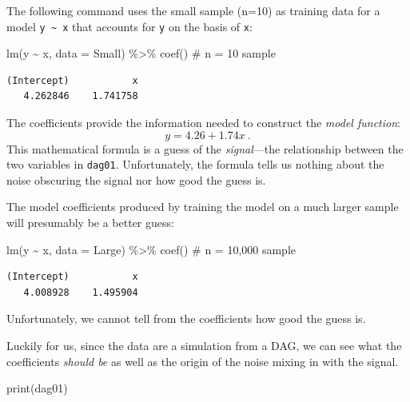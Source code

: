 \documentclass[
  letterpaper,
  DIV=11,
  numbers=noendperiod,
  oneside]{scrreprt}
\newenvironment{Shaded}{\begin{snugshade}}{\end{snugshade}}
\newcommand{\AttributeTok}[1]{\textcolor[rgb]{0.40,0.45,0.13}{#1}}
\newcommand{\CommentTok}[1]{\textcolor[rgb]{0.37,0.37,0.37}{#1}}
\newcommand{\FunctionTok}[1]{\textcolor[rgb]{0.28,0.35,0.67}{#1}}
\newcommand{\NormalTok}[1]{\textcolor[rgb]{0.00,0.23,0.31}{#1}}
\newcommand{\SpecialCharTok}[1]{\textcolor[rgb]{0.37,0.37,0.37}{#1}}
\begin{document}
The following command uses the small sample (n=10) as training data for
a model \texttt{y\ \textasciitilde{}\ x} that accounts for \texttt{y} on
the basis of \texttt{x}:

\begin{Shaded}
\begin{Highlighting}[]
\FunctionTok{lm}\NormalTok{(y }\SpecialCharTok{\textasciitilde{}}\NormalTok{ x, }\AttributeTok{data =}\NormalTok{ Small) }\SpecialCharTok{\%\textgreater{}\%} \FunctionTok{coef}\NormalTok{()  }\CommentTok{\# n = 10 sample}
\end{Highlighting}
\end{Shaded}

\begin{verbatim}
(Intercept)           x 
   4.262846    1.741758 
\end{verbatim}

The coefficients provide the information needed to construct the
\emph{model function}: \[y = 4.26 + 1.74 x\ .\] This mathematical
formula is a guess of the \emph{signal}---the relationship between the
two variables in \texttt{dag01}. Unfortunately, the formula tells us
nothing about the noise obscuring the signal nor how good the guess is.

The model coefficients produced by training the model on a much larger
sample will presumably be a better guess:

\begin{Shaded}
\begin{Highlighting}[]
\FunctionTok{lm}\NormalTok{(y }\SpecialCharTok{\textasciitilde{}}\NormalTok{ x, }\AttributeTok{data =}\NormalTok{ Large) }\SpecialCharTok{\%\textgreater{}\%} \FunctionTok{coef}\NormalTok{() }\CommentTok{\#  n = 10,000 sample}
\end{Highlighting}
\end{Shaded}

\begin{verbatim}
(Intercept)           x 
   4.008928    1.495904 
\end{verbatim}

Unfortunately, we cannot tell from the coefficients how good the guess
is.

Luckily for us, since the data are a simulation from a DAG, we can see
what the coefficients \emph{should be} as well as the origin of the
noise mixing in with the signal.

\begin{Shaded}
\begin{Highlighting}[]
\FunctionTok{print}\NormalTok{(dag01)}
\end{Highlighting}
\end{Shaded}
\end{document}
